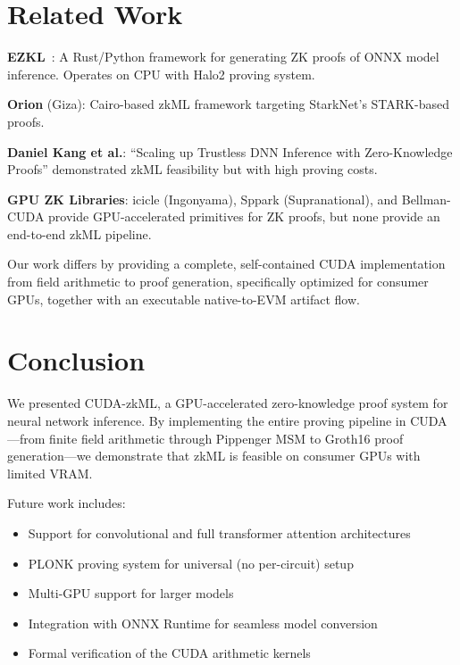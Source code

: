 \documentclass[11pt,a4paper]{article}
\begin{document}
\section{Related Work}

\textbf{EZKL}~\cite{ezkl}: A Rust/Python framework for generating
ZK proofs of ONNX model inference. Operates on CPU with
Halo2 proving system.

\textbf{Orion} (Giza): Cairo-based zkML framework targeting
StarkNet's STARK-based proofs.

\textbf{Daniel Kang et al.}: ``Scaling up Trustless DNN Inference
with Zero-Knowledge Proofs'' demonstrated zkML feasibility but
with high proving costs.

\textbf{GPU ZK Libraries}: icicle (Ingonyama), Sppark (Supranational),
and Bellman-CUDA provide GPU-accelerated primitives for ZK proofs,
but none provide an end-to-end zkML pipeline.

Our work differs by providing a complete, self-contained CUDA
implementation from field arithmetic to proof generation, specifically
optimized for consumer GPUs, together with an executable native-to-EVM
artifact flow.

\section{Conclusion}

We presented CUDA-zkML, a GPU-accelerated zero-knowledge proof
system for neural network inference. By implementing the entire
proving pipeline in CUDA—from finite field arithmetic through
Pippenger MSM to Groth16 proof generation—we demonstrate that
zkML is feasible on consumer GPUs with limited VRAM.

Future work includes:
\begin{itemize}
  \item Support for convolutional and full transformer attention architectures
  \item PLONK proving system for universal (no per-circuit) setup
  \item Multi-GPU support for larger models
  \item Integration with ONNX Runtime for seamless model conversion
  \item Formal verification of the CUDA arithmetic kernels
\end{itemize}
\end{document}
